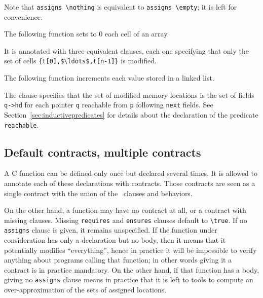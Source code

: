 Note that \lstinline|assigns \nothing| is equivalent to
\lstinline|assigns \empty|; it is left for convenience.

\begin{example}
  The following function sets to 0 each cell of an array.

%
  It is annotated with three equivalent \assigns{} clauses, each one
  specifying that only the set of cells
  \lstinline|{t[0],$\ldots$,t[n-1]}|
  is modified.
\end{example}

\begin{example}
  \label{ex:locations-list}
  The following function increments each value stored in a linked
  list.

%
  The \assigns{} clause specifies that the set of modified memory
  locations is the set of fields \lstinline|q->hd| for each pointer
  \lstinline|q|
  reachable from \lstinline|p| following \lstinline|next| fields. See
  Section~\ref{sec:inductivepredicates} for details about the
  declaration of the predicate \texttt{reachable}.
\end{example}

\subsection{Default contracts, multiple contracts}
\label{sec:multiplecontracts}

A C function can be defined only once but declared several times.
It is allowed to annotate each of these declarations with contracts.
Those contracts are seen as a single contract with the union of the
\requires\ clauses and behaviors.

On the other hand, a function may have no contract at all, or a
contract with missing clauses. Missing \lstinline|requires| and
\lstinline|ensures| clauses default to \lstinline!\true!.
If no \lstinline|assigns| clause is given, it remains unspecified. If the
function under consideration has only a declaration but no body, then
it means that it potentially modifies ``everything'', hence in practice
it will be impossible to verify anything about programs calling that
function; in other words giving it a contract is in practice
mandatory. On the other hand, if that function has a body, giving no
\lstinline|assigns| clause means in practice that it is left to tools to
compute an over-approximation of the sets of assigned locations.

